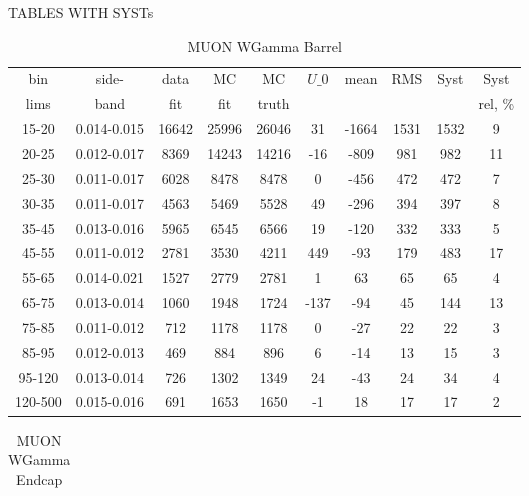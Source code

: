 \documentclass{beamer}
\begin{document}
\begin{frame}
\centering
\huge
TABLES WITH SYSTs
\end{frame}

\begin{frame}
\begin{table}[h]
  	\tiny
  \begin{center}
  \caption{MUON WGamma Barrel}
  \begin{tabular}{|c|c|c|c|c|c|c|c|c|c|}
    bin & side- & data & MC & MC    & $U\_{0}$ & mean & RMS & Syst & Syst \\ 
    lims & band & fit & fit & truth &       &      &     &      & rel, \% \\ \hline
    15-20 & 0.014-0.015 & 16642 & 25996 & 26046 & 31 & -1664 & 1531 & 1532 & 9  \\ \hline
    20-25 & 0.012-0.017 & 8369 & 14243 & 14216 & -16 & -809 & 981 & 982 & 11  \\ \hline
    25-30 & 0.011-0.017 & 6028 & 8478 & 8478 & 0 & -456 & 472 & 472 & 7  \\ \hline
    30-35 & 0.011-0.017 & 4563 & 5469 & 5528 & 49 & -296 & 394 & 397 & 8  \\ \hline
    35-45 & 0.013-0.016 & 5965 & 6545 & 6566 & 19 & -120 & 332 & 333 & 5  \\ \hline
    45-55 & 0.011-0.012 & 2781 & 3530 & 4211 & 449 & -93 & 179 & 483 & 17  \\ \hline
    55-65 & 0.014-0.021 & 1527 & 2779 & 2781 & 1 & 63 & 65 & 65 & 4  \\ \hline
    65-75 & 0.013-0.014 & 1060 & 1948 & 1724 & -137 & -94 & 45 & 144 & 13  \\ \hline
    75-85 & 0.011-0.012 & 712 & 1178 & 1178 & 0 & -27 & 22 & 22 & 3  \\ \hline
    85-95 & 0.012-0.013 & 469 & 884 & 896 & 6 & -14 & 13 & 15 & 3  \\ \hline
    95-120 & 0.013-0.014 & 726 & 1302 & 1349 & 24 & -43 & 24 & 34 & 4  \\ \hline
    120-500 & 0.015-0.016 & 691 & 1653 & 1650 & -1 & 18 & 17 & 17 & 2  \\ \hline
  \end{tabular}
  \label{tab:systSbVar_Meth1_MUON_WGamma_Barrel}
  \end{center}
\end{table}
\begin{table}[h]
  	\tiny
  \begin{center}
  \caption{MUON WGamma Endcap}
  \begin{tabular}{|c|c|c|c|c|c|c|c|c|c|}

\end{tabular}
\end{center}
\end{table}
\end{frame}
\end{document}
